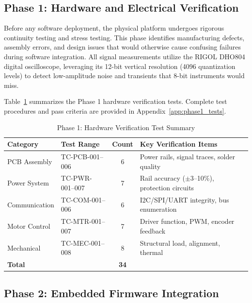 \subsection{Phase 1: Hardware and Electrical Verification}

Before any software deployment, the physical platform undergoes rigorous continuity testing and stress testing. This phase identifies manufacturing defects, assembly errors, and design issues that would otherwise cause confusing failures during software integration. All signal measurements utilize the RIGOL DHO804 digital oscilloscope, leveraging its 12-bit vertical resolution (4096 quantization levels) to detect low-amplitude noise and transients that 8-bit instruments would miss.

Table~\ref{tab:phase1_summary} summarizes the Phase 1 hardware verification tests. Complete test procedures and pass criteria are provided in Appendix~\ref{app:phase1_tests}.

\begin{table}[H]
    \centering
    \caption{Phase 1: Hardware Verification Test Summary}
    \label{tab:phase1_summary}
    \begin{tabular}{@{}llcl@{}}
        \toprule
        \textbf{Category} & \textbf{Test Range} & \textbf{Count} & \textbf{Key Verification Items} \\
        \midrule
        PCB Assembly & TC-PCB-001--006 & 6 & Power rails, signal traces, solder quality \\
        Power System & TC-PWR-001--007 & 7 & Rail accuracy ($\pm$3--10\%), protection circuits \\
        Communication & TC-COM-001--006 & 6 & I2C/SPI/UART integrity, bus enumeration \\
        Motor Control & TC-MTR-001--007 & 7 & Driver function, PWM, encoder feedback \\
        Mechanical & TC-MEC-001--008 & 8 & Structural load, alignment, thermal \\
        \midrule
        \textbf{Total} & & \textbf{34} & \\
        \bottomrule
    \end{tabular}
\end{table}

\subsection{Phase 2: Embedded Firmware Integration}

